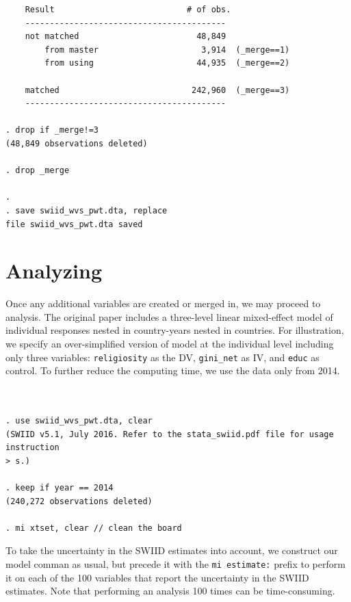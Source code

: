 \documentclass[11pt,]{article}
\theoremstyle{definition}
\theoremstyle{definition}
\theoremstyle{remark}
\begin{document}
\begin{verbatim}
    Result                           # of obs.
    -----------------------------------------
    not matched                        48,849
        from master                     3,914  (_merge==1)
        from using                     44,935  (_merge==2)

    matched                           242,960  (_merge==3)
    -----------------------------------------

. drop if _merge!=3
(48,849 observations deleted)

. drop _merge

. 
. save swiid_wvs_pwt.dta, replace
file swiid_wvs_pwt.dta saved
\end{verbatim}

\section{Analyzing}\label{analyzing}

Once any additional variables are created or merged in, we may proceed
to analysis. The original paper includes a three-level linear
mixed-effect model of individual responses nested in country-years
nested in countries. For illustration, we specify an over-simplified
version of model at the individual level including only three variables:
\texttt{religiosity} as the DV, \texttt{gini\_net} as IV, and
\texttt{educ} as control. To further reduce the computing time, we use
the data only from 2014.

\begin{verbatim}


. use swiid_wvs_pwt.dta, clear
(SWIID v5.1, July 2016. Refer to the stata_swiid.pdf file for usage instruction
> s.)

. keep if year == 2014
(240,272 observations deleted)

. mi xtset, clear // clean the board
\end{verbatim}

To take the uncertainty in the SWIID estimates into account, we
construct our model comman as usual, but precede it with the
\texttt{mi\ estimate:} prefix to perform it on each of the 100 variables
that report the uncertainty in the SWIID estimates. Note that performing
an analysis 100 times can be time-consuming.
\end{document}
